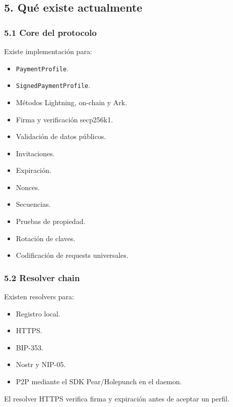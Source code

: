 \documentclass[
]{article}
\providecommand{\tightlist}{%
  \setlength{\itemsep}{0pt}\setlength{\parskip}{0pt}}
\begin{document}
\hypertarget{quuxe9-existe-actualmente}{%
\subsection{5. Qué existe actualmente}\label{quuxe9-existe-actualmente}}

\hypertarget{core-del-protocolo}{%
\subsubsection{5.1 Core del protocolo}\label{core-del-protocolo}}

Existe implementación para:

\begin{itemize}
\tightlist
\item
  \texttt{PaymentProfile}.
\item
  \texttt{SignedPaymentProfile}.
\item
  Métodos Lightning, on-chain y Ark.
\item
  Firma y verificación secp256k1.
\item
  Validación de datos públicos.
\item
  Invitaciones.
\item
  Expiración.
\item
  Nonces.
\item
  Secuencias.
\item
  Pruebas de propiedad.
\item
  Rotación de claves.
\item
  Codificación de requests universales.
\end{itemize}

\hypertarget{resolver-chain}{%
\subsubsection{5.2 Resolver chain}\label{resolver-chain}}

Existen resolvers para:

\begin{itemize}
\tightlist
\item
  Registro local.
\item
  HTTPS.
\item
  BIP-353.
\item
  Nostr y NIP-05.
\item
  P2P mediante el SDK Pear/Holepunch en el daemon.
\end{itemize}

El resolver HTTPS verifica firma y expiración antes de aceptar un
perfil.
\end{document}
